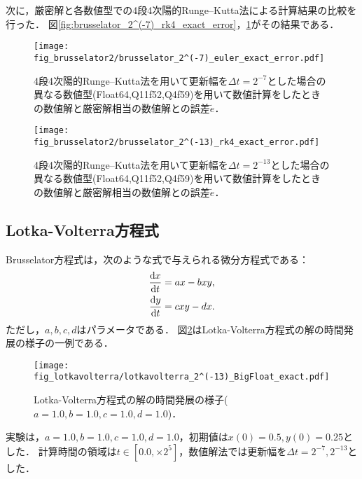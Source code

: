 次に，厳密解と各数値型での4段4次陽的Runge--Kutta法による計算結果の比較を行った．
図\ref{fig:brusselator_2^(-7)_rk4_exact_error}，\ref{fig:brusselator_2^(-13)_rk4_exact_error}がその結果である．\\
\begin{figure}[H]
    \centering
    \begin{minipage}[b]{0.48\columnwidth}
        \centering
        \texttt{[image: fig\_brusselator2/brusselator\_2^(-7)\_euler\_exact\_error.pdf]}
        \caption{4段4次陽的Runge--Kutta法を用いて更新幅を$\Delta t = 2^{-7}$とした場合の異なる数値型(Float64,Q11f52,Q4f59)を用いて数値計算をしたときの数値解と厳密解相当の数値解との誤差$\tilde{e}$．}
        \label{fig:brusselator_2^(-7)_rk4_exact_error}
    \end{minipage}
    \hspace{0.01\columnwidth}
    \begin{minipage}[b]{0.48\columnwidth}
        \centering
        \texttt{[image: fig\_brusselator2/brusselator\_2^(-13)\_rk4\_exact\_error.pdf]}
        \caption{4段4次陽的Runge--Kutta法を用いて更新幅を$\Delta t =  2^{-13}$とした場合の異なる数値型(Float64,Q11f52,Q4f59)を用いて数値計算をしたときの数値解と厳密解相当の数値解との誤差$\tilde{e}$．}
        \label{fig:brusselator_2^(-13)_rk4_exact_error}
    \end{minipage}
\end{figure}

\subsection{Lotka-Volterra方程式}
Brusselator方程式は，次のような式で与えられる微分方程式である：
\begin{align*}
    \frac{\mathrm{d}x}{\mathrm{d}t} &=  ax - bxy,\\
    \frac{\mathrm{d}y}{\mathrm{d}t} &= cxy - dx.
\end{align*}
ただし，$a,b,c,d$はパラメータである．
図\ref{fig:lotkavolterra}はLotka-Volterra方程式の解の時間発展の様子の一例である．
\begin{figure}[H]
    \centering
    \begin{minipage}[b]{0.9\columnwidth}
            \texttt{[image: fig\_lotkavolterra/lotkavolterra\_2^(-13)\_BigFloat\_exact.pdf]}
    \end{minipage}
    \caption{Lotka-Volterra方程式の解の時間発展の様子($a=1.0, b=1.0, c=1.0, d=1.0$)．}
    \label{fig:lotkavolterra}
\end{figure}
実験は，$a=1.0, b=1.0, c=1.0, d=1.0$，初期値は$x(0) = 0.5, y(0) = 0.25$とした．
計算時間の領域は$t \in [0.0, \times 2^5]$，数値解法では更新幅を$\Delta t =  2^{-7}, 2^{-13}$とした．


